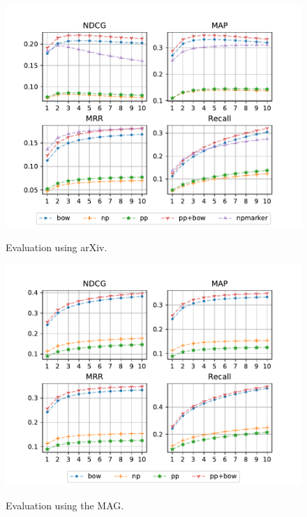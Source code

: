 \begin{figure}
  \centering
    \includegraphics[width=.9\textwidth]{figures/evaluation/arXiv_CS_select.pdf}
  \label{fig:evalarxiv}
  \caption{Evaluation using arXiv.}

  \centering
    \includegraphics[width=.9\textwidth]{figures/evaluation/MAG_CS_es_wAbs_3M.pdf}
  \label{fig:evalmag}
  \caption{Evaluation using the MAG.}
\end{figure}

